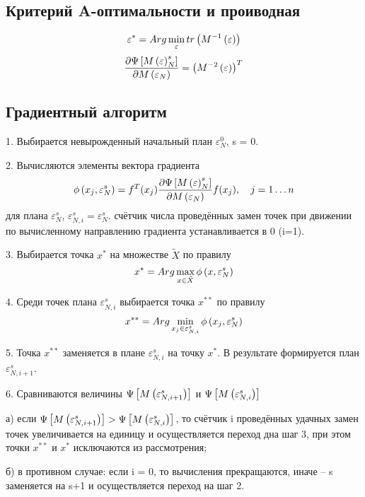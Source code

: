 \subsection{Критерий A-оптимальности и проиводная}
\[ \varepsilon^* = Arg \min_\varepsilon tr \left( M^{-1} \left( \varepsilon \right)  \right) \]
\[ \frac{\partial \Psi \left[  M \left( \varepsilon \right)^s_N  \right] }
{\partial M\left( \varepsilon_N \right)} = \left( M^{-2} \left( \varepsilon \right) \right)^T \]



\subsection{Градиентный алгоритм}

1. Выбирается невырожденный начальный план $\varepsilon^0_N$, s = 0.

2. Вычисляются элементы вектора градиента
\[ \phi \left( x_j, \varepsilon^s_N \right) = f^T(x_j) 
\frac{\partial \Psi \left[  M \left( \varepsilon \right)^s_N  \right] }
{\partial M\left( \varepsilon_N \right)} f(x_j), \quad j=1 \ldots n \]
для плана $\varepsilon^s_N$, $\varepsilon^s_{N, i} = \varepsilon^s_N$.
счётчик числа проведённых замен точек при движении по вычисленному направлению
градиента устанавливается в 0 (i=1).


3. Выбирается точка $x^*$ на множестве $\tilde{X}$ по правилу
\[x^* = Arg \max_{x \in \tilde{X}} \phi \left( x, \varepsilon^s_N \right) \]

4. Среди точек плана $\varepsilon^s_{N,i}$ выбирается точка $x^{**}$ по правилу
\[x^{**} = Arg \min_{x_j \in \varepsilon^s_{N, i}} \phi \left( x_j, \varepsilon^s_N \right) \]

5. Точка $x^{**}$ заменяется в плане $\varepsilon^s_{N,i}$ на точку $x^*$.
В результате формируется план $\varepsilon^s_{N,i+1}$.

6. Сравниваются величины $\Psi \left[  M \left(  \varepsilon^s_{N,i+1} \right)  \right]$ и  $\Psi \left[  M \left(  \varepsilon^s_{N,i} \right)  \right]$

а) если  $\Psi \left[  M \left(  \varepsilon^s_{N,i+1} \right)  \right] > \Psi \left[  M \left(  \varepsilon^s_{N,i} \right)  \right]$,
то счётчик i проведённых удачных замен точек увеличивается на единицу и осуществляется переход дна шаг 3,
при этом точки $x^{**}$ и $x^{*}$ исключаются из рассмотрения;

б) в противном случае: если i = 0, то вычисления прекращаются, иначе -- s заменяется на s+1
и осуществляется переход на шаг 2.




